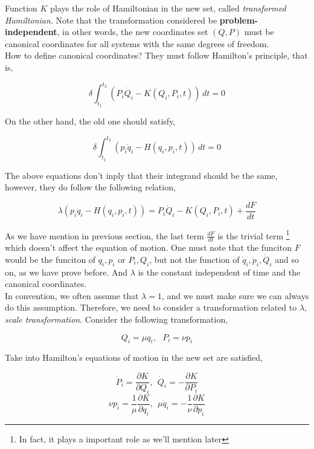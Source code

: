 \documentclass[12pt]{article}
\numberwithin{equation}{section}
\begin{document}
Function $K$ plays the role of Hamiltonian in the new set, called \textit{transformed Hamiltonian}. Note that the transformation considered be \textbf{problem-independent}, in other words, the new coordinates set $(Q,P)$ must be canonical coordinates for all systems with the same degrees of freedom.
\\
How to define canonical coordinates? They must follow Hamilton's principle, that is,

\begin{center}
    \[ \delta \int_{t_1}^{t_2} \left( P_i\dot{Q}_i - K(Q_i, P_i, t) \right) \, dt = 0 \]
\end{center}

On the other hand, the old one should satisfy, 

\begin{center}
    \[ \delta \int_{t_1}^{t_2} \left( p_i\dot{q}_i - H(q_i, p_i, t) \right) \, dt = 0 \]
\end{center}

The above equations don't inply that their integrand should be the same, however, they do follow the following relation,

\begin{center}
    \[ \lambda \left(p_i\dot{q}_i - H(q_i, p_i, t) \right) = P_i\dot{Q}_i - K(Q_i, P_i, t) + \frac{dF}{dt} \]
\end{center}

As we have mention in previous section, the last term $\frac{dF}{dt}$ is the trivial term \footnote{In fact, it plays a important role as we'll mention later} which doesn't affect the equation of motion. One must note that the funciton $F$ would be the funciton of $q_i, p_i$ or $P_i, Q_i$, but not the function of $\dot{q}_i, \dot{p}_i, \dot{Q}_i$ and so on, as we have prove before. And $\lambda$ is the constant independent of time and the canonical coordinates.
\\
\indent In convention, we often assume that $\lambda = 1$, and we must make sure we can always do this assumption. Therefore, we need to consider a transformation related to $\lambda$, \textit{scale transformation}. Consider the following transformation, 

\begin{center}
    \[ Q_i = \mu q_i,\ \ \ P_i = \nu p_i \]
\end{center}

Take into Hamilton's equations of motion in the new set are satisfied,

\begin{center}
    \[ \dot{P}_i = \frac{\partial K}{\partial Q_i},\ \ \dot{Q}_i = - \frac{\partial K}{\partial P_i} \]
    \[ \nu p_i = \frac{1}{\mu} \frac{\partial K}{\partial q_i},\ \ \mu \dot{q}_i = -\frac{1}{\nu} \frac{\partial K}{\partial p_i} \]
\end{center}
\end{document}
